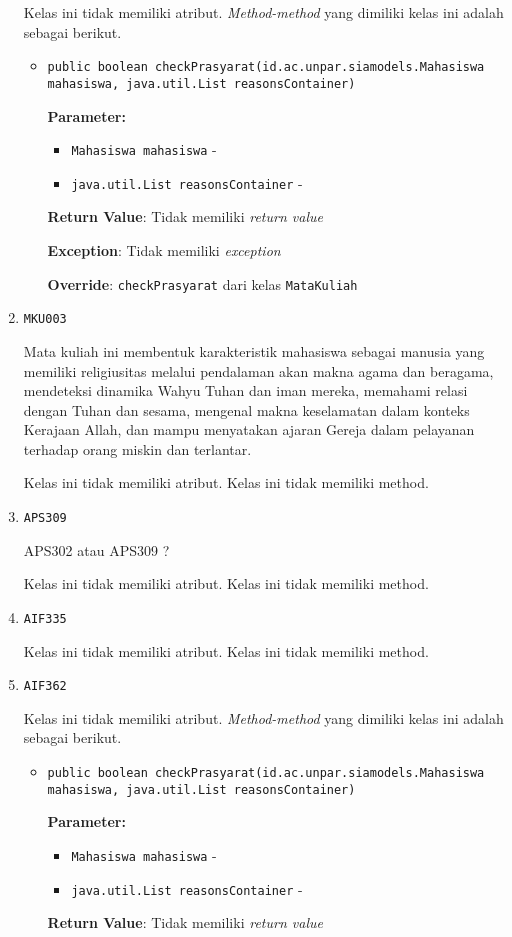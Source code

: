 \documentclass{article}
\begin{document}
\begin{enumerate}
Kelas ini tidak memiliki atribut. \textit{Method-method} yang dimiliki kelas ini adalah sebagai berikut.
\begin{itemize}
\item \texttt{public boolean checkPrasyarat(id.ac.unpar.siamodels.Mahasiswa mahasiswa, java.util.List reasonsContainer)}

\textbf{Parameter:}
\begin{itemize}
\item \texttt{Mahasiswa mahasiswa} - 
\item \texttt{java.util.List reasonsContainer} - 
\end{itemize}
\textbf{Return Value}: Tidak memiliki \textit{return value}

\textbf{Exception}: Tidak memiliki \textit{exception}

\textbf{Override}: \texttt{checkPrasyarat} dari kelas \texttt{MataKuliah}

\end{itemize}
\item \texttt{MKU003}

Mata kuliah ini membentuk karakteristik mahasiswa sebagai manusia yang memiliki religiusitas
 melalui pendalaman akan makna agama dan beragama, mendeteksi dinamika Wahyu Tuhan dan iman 
 mereka, memahami relasi dengan Tuhan dan sesama, mengenal makna keselamatan dalam konteks 
 Kerajaan Allah, dan mampu menyatakan ajaran Gereja dalam pelayanan terhadap orang miskin dan
 terlantar.

Kelas ini tidak memiliki atribut. Kelas ini tidak memiliki method. \item \texttt{APS309}

APS302 atau APS309 ?

Kelas ini tidak memiliki atribut. Kelas ini tidak memiliki method. \item \texttt{AIF335}



Kelas ini tidak memiliki atribut. Kelas ini tidak memiliki method. \item \texttt{AIF362}



Kelas ini tidak memiliki atribut. \textit{Method-method} yang dimiliki kelas ini adalah sebagai berikut.
\begin{itemize}
\item \texttt{public boolean checkPrasyarat(id.ac.unpar.siamodels.Mahasiswa mahasiswa, java.util.List reasonsContainer)}

\textbf{Parameter:}
\begin{itemize}
\item \texttt{Mahasiswa mahasiswa} - 
\item \texttt{java.util.List reasonsContainer} - 
\end{itemize}
\textbf{Return Value}: Tidak memiliki \textit{return value}


\end{itemize}
\end{enumerate}
\end{document}
